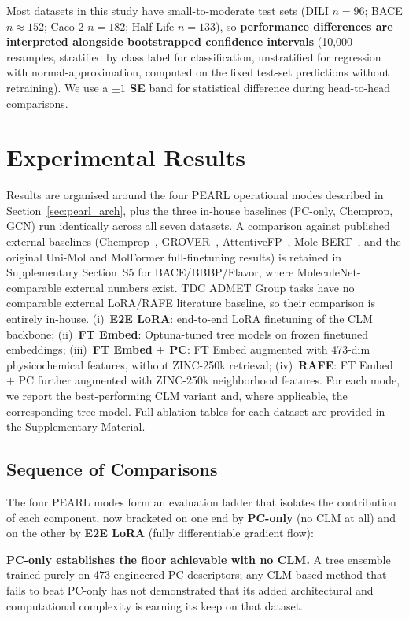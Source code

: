 \documentclass[final,1p,times]{elsarticle}
\begin{document}
Most datasets in this study have small-to-moderate test sets (DILI $n=96$; BACE $n\approx152$; Caco-2 $n=182$; Half-Life $n=133$), so \textbf{performance differences are interpreted alongside bootstrapped confidence intervals} (10{,}000 resamples, stratified by class label for classification, unstratified for regression with normal-approximation, computed on the fixed test-set predictions without retraining). We use a \textbf{$\pm 1$ SE} band for statistical difference during head-to-head comparisons.

\section{Experimental Results} \label{experimental_results}
Results are organised around the four PEARL operational modes described in Section~\ref{sec:pearl_arch}, plus the three in-house baselines (PC-only, Chemprop, GCN) run identically across all seven datasets. A comparison against published external baselines (Chemprop~\cite{yang2019chemprop}, GROVER~\cite{rong2020grover}, AttentiveFP~\cite{xiong2020attentivefp}, Mole-BERT~\cite{xia2023molecbert}, and the original Uni-Mol and MolFormer full-finetuning results) is retained in Supplementary Section~S5 for BACE/BBBP/Flavor, where MoleculeNet-comparable external numbers exist. TDC ADMET Group tasks have no comparable external LoRA/RAFE literature baseline, so their comparison is entirely in-house.
(i)~\textbf{E2E LoRA}: end-to-end LoRA finetuning of the CLM backbone;
(ii)~\textbf{FT Embed}: Optuna-tuned tree models on frozen finetuned embeddings;
(iii)~\textbf{FT Embed $+$ PC}: FT Embed augmented with 473-dim physicochemical features, without ZINC-250k retrieval;
(iv)~\textbf{RAFE}: FT Embed $+$ PC further augmented with ZINC-250k neighborhood features.
For each mode, we report the best-performing CLM variant and, where applicable, the corresponding tree model. Full ablation tables for each dataset are provided in the Supplementary Material.

\subsection{Sequence of Comparisons}\label{sec:comparison_sequence}
The four PEARL modes form an evaluation ladder that isolates the contribution of each component, now bracketed on one end by \textbf{PC-only} (no CLM at all) and on the other by \textbf{E2E LoRA} (fully differentiable gradient flow):

\textbf{PC-only establishes the floor achievable with no CLM.} A tree ensemble trained purely on 473 engineered PC descriptors; any CLM-based method that fails to beat PC-only has not demonstrated that its added architectural and computational complexity is earning its keep on that dataset.
\end{document}
